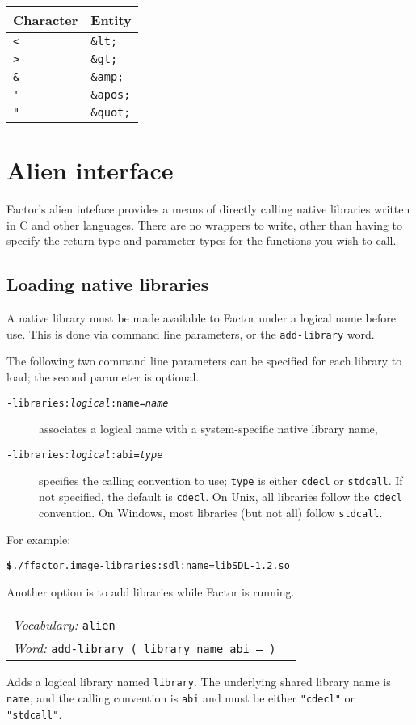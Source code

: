 \documentclass{book}
\newcommand{\vocabulary}[1]{\emph{Vocabulary:} \texttt{#1}&\\}
\newcommand{\ordinaryword}[2]{\index{\texttt{#1}}\emph{Word:} \texttt{#2}&\\}
\newcommand{\wordtable}[1]{


\begin{tabularx}{12cm}{lX}
\hline
#1
\hline
\end{tabularx}

}
\begin{document}
\begin{tabular}{l|l}
Character&Entity\\
\hline
\verb|<|   &\verb|&lt;|\\
\verb|>|   &\verb|&gt;|\\
\verb|&|   &\verb|&amp;|\\
\verb|'|   &\verb|&apos;|\\
\verb|"|   &\verb|&quot;|
\end{tabular}

\chapter{Alien interface}

Factor's alien inteface provides a means of directly calling native libraries written in C and other languages. There are no
wrappers to write, other than having to specify the return type and parameter types for
the functions you wish to call.

\section{Loading native libraries}

A native library must be made available to Factor under a logical name before use. This is done via command line parameters, or the \verb|add-library| word.

The following two command line parameters can be specified for each library to load; the second parameter is optional.
\begin{description}
\item[\texttt{-libraries:\emph{logical}:name=\emph{name}}] associates a logical name with a system-specific native library name,
\item[\texttt{-libraries:\emph{logical}:abi=\emph{type}}] specifies the calling convention to use; \verb|type| is either \verb|cdecl| or \verb|stdcall|. If not specified, the default is \verb|cdecl|. On Unix, all libraries follow the \verb|cdecl| convention. On Windows, most libraries (but not all) follow \verb|stdcall|.
\end{description}

For example:
\begin{alltt}
\textbf{\$} ./f factor.image -libraries:sdl:name=libSDL-1.2.so
\end{alltt}

Another option is to add libraries while Factor is running.
\wordtable{
\vocabulary{alien}
\ordinaryword{add-library}{add-library ( library name abi -- )}
}
Adds a logical library named \verb|library|. The underlying shared library name is \verb|name|, and the calling convention is \verb|abi| and must be either \verb|"cdecl"| or \verb|"stdcall"|.
\end{document}
